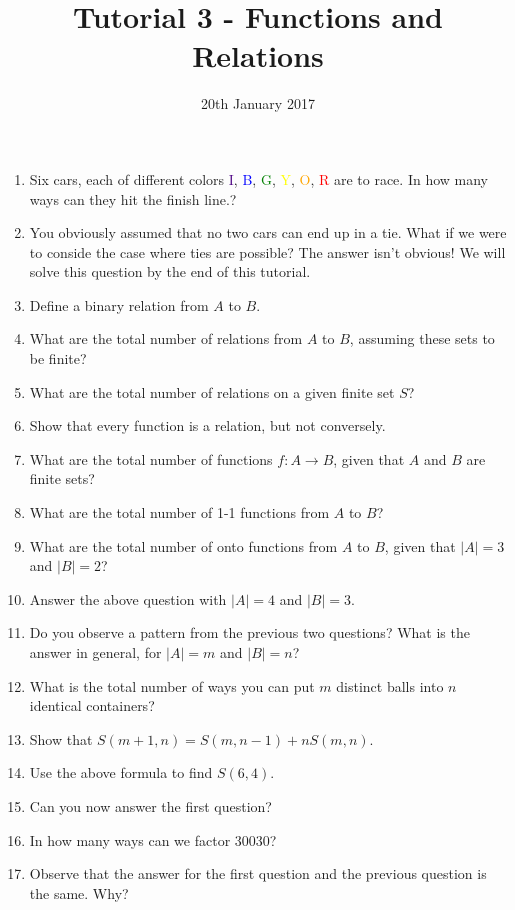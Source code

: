 \documentclass[a4paper]{article}
\title{Tutorial 3 - Functions and Relations}
\date{20th January 2017}
\begin{document}
\maketitle
\begin{enumerate}
\item Six cars, each of different colors \textcolor{indigo}{I}, \textcolor{blue}{B}, \textcolor{green}{G}, \textcolor{yellow}{Y}, \textcolor{orange}{O}, \textcolor{red}{R} are to race. In how many ways can they hit the finish line.?
\item You obviously assumed that no two cars can end up in a tie. What if we were to conside the case where ties are possible? The answer isn't obvious! We will solve this question by the end of this tutorial.
\item Define a binary relation from $A$ to $B$.
\item What are the total number of relations from $A$ to $B$, assuming these sets to be finite?
\item What are the total number of relations on a given finite set $S$?
\item Show that every function is a relation, but not conversely.
\item What are the total number of functions $f: A\rightarrow B $, given that $A$ and $B$ are finite sets?
\item What are the total number of 1-1 functions from $A$ to $B$?
\item What are the total number of onto functions from $A$ to $B$, given that $|A|=3$ and $|B|=2$?
\item Answer the above question with $|A|=4$ and $|B|=3$.
\item Do you observe a pattern from the previous two questions? What is the answer in general, for $|A|=m$ and $|B|=n$?
\item What is the total number of ways you can put $m$ distinct balls into $n$ identical containers?
\item Show that $S(m+1,n)=S(m,n-1)+nS(m,n)$.
\item Use the above formula to find $S(6,4)$.
\item Can you now answer the first question?
\item In how many ways can we factor 30030?
\item Observe that the answer for the first question and the previous question is the same. Why?

\end{enumerate}
\end{document}
